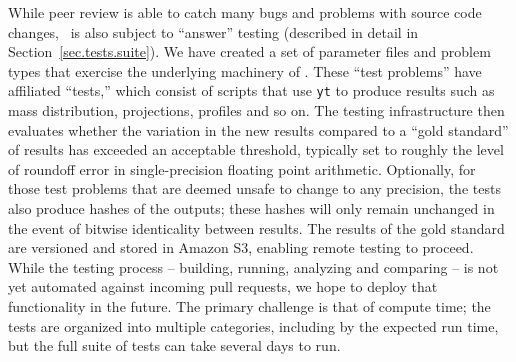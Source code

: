 While peer review is able to catch many bugs and problems with source
code changes, \enzo\ is also subject to ``answer'' testing (described
in detail in Section~\ref{sec.tests.suite}).  We have created a set of
parameter files and problem types that exercise the underlying
machinery of \enzo.  These ``test problems'' have affiliated
``tests,'' which consist of scripts that use \texttt{yt}
\citep{2011ApJS..192....9T} to produce results such as mass
distribution, projections, profiles and so on.  The testing
infrastructure then evaluates whether the variation in the new results
compared to a ``gold standard'' of results has exceeded an acceptable
threshold, typically set to roughly the level of roundoff error in
single-precision floating point arithmetic.  Optionally, for those
test problems that are deemed unsafe to change to any precision, the
tests also produce hashes of the outputs; these hashes will only
remain unchanged in the event of bitwise identicality between results.
The results of the gold standard are versioned and stored in Amazon
S3, enabling remote testing to proceed.  While the testing process --
building, running, analyzing and comparing -- is not yet automated
against incoming pull requests, we hope to deploy that functionality
in the future.  The primary challenge is that of compute time; the
tests are organized into multiple categories, including by the
expected run time, but the full suite of tests can take several days
to run.

